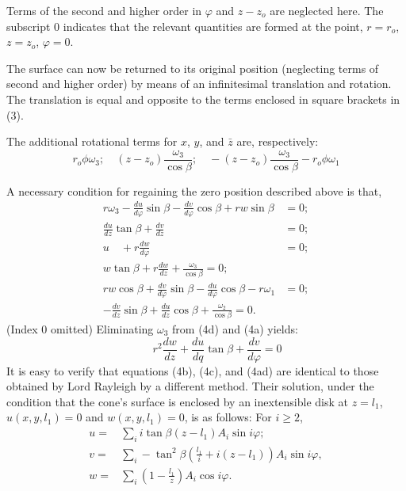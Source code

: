 \documentclass[11pt]{amsart}
\begin{document}
Terms of the second and higher order in \(\varphi\) and \(z-z_o\) are neglected
here.  The subscript \(0\) indicates that the relevant quantities are formed at
the point, \(r = r_o\), \(z = z_o\), \(\varphi = 0\).

The surface can now be returned to its original position (neglecting terms of
second and higher order) by means of an infinitesimal translation and rotation.
The translation is equal and opposite to the terms enclosed in square brackets in (3).

The additional rotational terms for \(x\), \(y\), and
\(\bar{z}\) are, respectively:
\[r_o \phi \omega_3;\quad (z - z_o)
\frac{\omega_3}{\cos \beta};\quad -(z - z_o)
\frac{\omega_3}{\cos \beta} - r_o \phi \omega_1\]

A necessary condition for regaining the zero position described above is that,
\begin{subequations}\label{eq4abcdef}
\begin{align}
r \omega_3-\frac{d u}{d \varphi} \sin \beta-\frac{d v}{d \varphi} \cos \beta+r w \sin \beta & =0; \\
\frac{d u}{d z} \tan \beta+\frac{d v}{d z} & =0; \\
u \quad+r \frac{d w}{d \varphi} & =0; \\
w \tan \beta + r \frac{d w}{d z}+\frac{\omega_3}{\cos \beta}=0; \\
r w \cos \beta+\frac{d v}{d \varphi} \sin \beta-\frac{d u}{d \varphi} \cos \beta-r \omega_1 & =0; \\
-\frac{d v}{d z} \sin \beta+\frac{d u}{d z} \cos \beta+\frac{\omega_2}{\cos \beta}=0 . &
\end{align}
\end{subequations}
(Index 0 omitted) Eliminating \(\omega_3\)  from (4d) and (4a) yields:
\[
\tag{4ad} \qquad
r^2 \frac{d w}{d z}+\frac{d u}{d q} \tan \beta+\frac{d v}{d \varphi}=0
\]
It is easy to verify that equations (4b), (4c), and (4ad) are identical to
those obtained by Lord Rayleigh \cite[p 399 Eq 14]{rayleigh_sound_v1_1945}
by a different method.
Their solution, under the condition that the cone's surface is enclosed by an
inextensible disk at \(z = l_1\), \(u(x,y, l_1)=0\) and \(w(x,y,l_1)=0\),
is as follows: For \( i \geq 2 \),
\begin{equation}\label{eq5p732}
\begin{aligned}
u=&\sum_i i \tan \beta\left(z-l_1\right) A_i \sin i \varphi; \\
v=&\sum_i-\tan^2 \beta\left( \frac{l_1}{i}+i\left(z-l_1\right)\right) A_i \sin i \varphi, \\
w=&\sum_i\left(1-\frac{l_1}{z}\right) A_i \cos i \varphi .
\end{aligned}
\end{equation}
\end{document}
